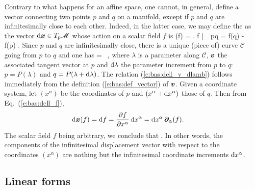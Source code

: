 Contrary to what happens for an affine space, one cannot, in general, define a vector connecting two points $p$ and $q$ on a manifold, except if $p$ and $q$ are infinitesimally close to each other. Indeed, in the latter case, we may define
the  as the vector $\mathrm{d}\bm{x}\in{{T_p\mathscr{M}}}$ whose action on a scalar field $f$ is
\be \label{e:bas:dell_f}
  \D{}(f) = \left. \D f \right| _{p\rightarrow q} = f(q) - f(p) .
\ee
Since $p$ and $q$ are infinitesimally close, there is a unique (piece of) curve
$\mathcal{C}$ going
from $p$ to $q$ and one has
\be \label{e:bas:dell_v_dlamb}
  \D{} =  \, \D\lambda ,
\ee
where $\lambda$ is a parameter along $\mathcal{C}$, $\bm{v}$ the associated tangent
vector at $p$ and $\mathrm{d}\lambda$ the parameter
increment from $p$ to $q$: $p=P(\lambda)$ and $q=P(\lambda+\mathrm{d}\lambda)$.
The relation (\ref{e:bas:dell_v_dlamb}) follows immediately from the definition
(\ref{e:bas:def_vector}) of $\bm{v}$.
Given a coordinate system, let $(x^\alpha)$ be the coordinates
of $p$ and $(x^\alpha+\mathrm{d} x^\alpha)$ those of $q$. Then from Eq.~(\ref{e:bas:dell_f}),
\[
  \mathrm{d}\bm{x}(f) =   \mathrm{d} f  = \frac{\partial f}{\partial x^\alpha} \, \mathrm{d} x^\alpha
  = \mathrm{d} x^\alpha \, \bm{\partial}_\alpha(f) .
\]
The scalar field $f$ being arbitrary, we conclude that
\be \label{e:bas:dell_dxa_wpar}
   .
\ee
In other words, the components of the infinitesimal displacement vector with respect
to the coordinates $(x^\alpha)$ are nothing but the infinitesimal coordinate
increments $\mathrm{d} x^\alpha$.

\subsection{Linear forms} \label{s:bas:linear_form}

